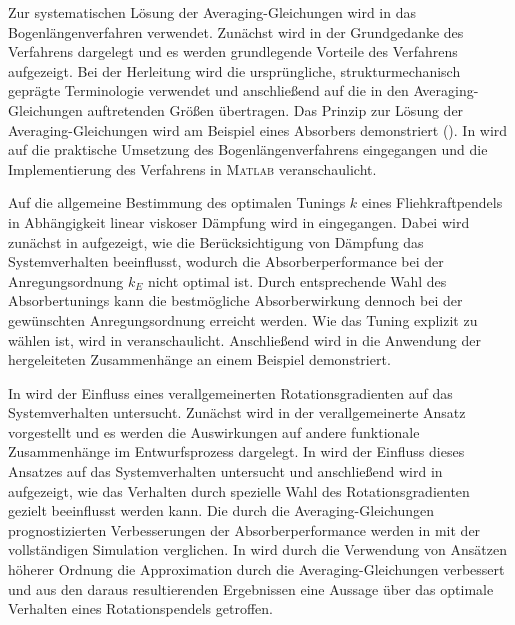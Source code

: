 Zur systematischen Lösung der Averaging-Gleichungen wird in  das
Bogenlängenverfahren verwendet.
Zunächst wird  in   der Grundgedanke des Verfahrens dargelegt 
und es werden grundlegende Vorteile des Verfahrens aufgezeigt. 
Bei der Herleitung wird die ursprüngliche, strukturmechanisch geprägte Terminologie verwendet und anschließend
auf die in den Averaging-Gleichungen auftretenden Größen übertragen.
Das Prinzip zur Lösung  der Averaging-Gleichungen wird  am 
Beispiel eines Absorbers demonstriert ().
In  wird auf  die praktische Umsetzung des Bogenlängenverfahrens eingegangen
und die Implementierung des Verfahrens in \textsc{Matlab} veranschaulicht.


Auf die allgemeine  Bestimmung des optimalen Tunings $k$ eines Fliehkraftpendels
in Abhängigkeit linear viskoser Dämpfung wird in  eingegangen.
Dabei wird zunächst in   aufgezeigt, wie die
Berücksichtigung von Dämpfung das Systemverhalten beeinflusst, wodurch
die Absorberperformance bei der Anregungsordnung $k_E$ nicht optimal ist.
Durch entsprechende Wahl des Absorbertunings kann die
bestmögliche Absorberwirkung dennoch bei der gewünschten Anregungsordnung erreicht werden.
Wie das Tuning explizit zu wählen ist, wird in   veranschaulicht.
Anschließend wird in  
die Anwendung der hergeleiteten Zusammenhänge an einem Beispiel demonstriert.


In  wird der Einfluss eines verallgemeinerten
Rotationsgradienten auf das Systemverhalten untersucht.
Zunächst wird in  der verallgemeinerte Ansatz vorgestellt
und es werden die Auswirkungen auf andere funktionale Zusammenhänge im Entwurfsprozess dargelegt.
In  wird der Einfluss dieses Ansatzes 
auf das Systemverhalten untersucht und anschließend wird in 
aufgezeigt, wie das Verhalten durch spezielle Wahl des Rotationsgradienten gezielt beeinflusst werden kann. 
Die durch die Averaging-Gleichungen prognostizierten Verbesserungen der Absorberperfor\-mance werden
in  mit der vollständigen Simulation verglichen. 
In  wird durch die Verwendung von 
Ansätzen höherer Ordnung die Approximation durch die Averaging-Gleichungen verbessert und aus den
daraus resultierenden Ergebnissen eine Aussage über das
optimale Verhalten eines Rotationspendels  getroffen.



